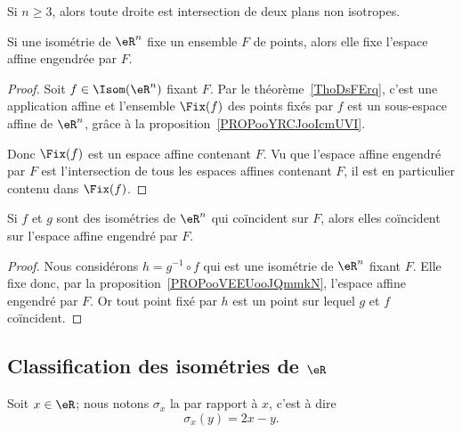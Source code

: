 \begin{lemma}
    Si \( n\geq 3\), alors toute droite est intersection de deux plans non isotropes.
\end{lemma}

\begin{proposition}      \label{PROPooVEEUooJQmmkN}
    Si une isométrie de \( \eR^n\) fixe un ensemble \( F\) de points, alors elle fixe l'espace affine engendrée par \( F\).
\end{proposition}

\begin{proof}
    Soit \( f\in \Isom(\eR^n)\) fixant \( F\). Par le théorème~\ref{ThoDsFErq}, c'est une application affine et l'ensemble \( \Fix(f)\) des points fixés par \( f\) est un sous-espace affine de \( \eR^n\), grâce à la proposition~\ref{PROPooYRCJooIcmUVI}.

    Donc \( \Fix(f)\) est un espace affine contenant \( F\). Vu que l'espace affine engendré par \( F\) est l'intersection de tous les espaces affines contenant \( F\), il est en particulier contenu dans \( \Fix(f)\).
\end{proof}

\begin{corollary}       \label{CORooZHZZooDgTzsW}
    Si \( f\) et \( g\) sont des isométries de \( \eR^n\) qui coïncident sur \( F\), alors elles coïncident sur l'espace affine engendré par \( F\).
\end{corollary}

\begin{proof}
    Nous considérons \( h=g^{-1}\circ f\) qui est une isométrie de \( \eR^n\) fixant \( F\). Elle fixe donc, par la proposition~\ref{PROPooVEEUooJQmmkN}, l'espace affine engendré par $F$. Or tout point fixé par \( h\) est un point sur lequel \( g\) et \( f\) coïncident.
\end{proof}

\subsection{Classification des isométries de \( \eR\)}

\begin{definition}
    Soit \( x\in \eR\); nous notons \( \sigma_x\) la  par rapport à \( x\), c'est à dire
    \begin{equation}
        \sigma_x(y)=2x-y.
    \end{equation}
\end{definition}

